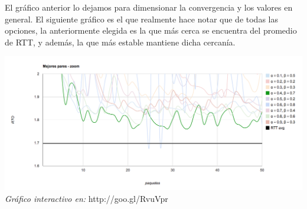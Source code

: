 El gráfico anterior lo dejamos para dimensionar la convergencia y los valores en general. El siguiente gráfico es el que realmente hace notar que de todas las opciones, la anteriormente elegida es la que más cerca se encuentra del promedio de RTT, y además, la que más estable mantiene dicha cercanía.

\begin{center}
	\includegraphics[scale=0.35]{graphics/best_pairs_zoom.png}
	\textit{Gráfico interactivo en:} http://goo.gl/RvuVpr
\end{center}